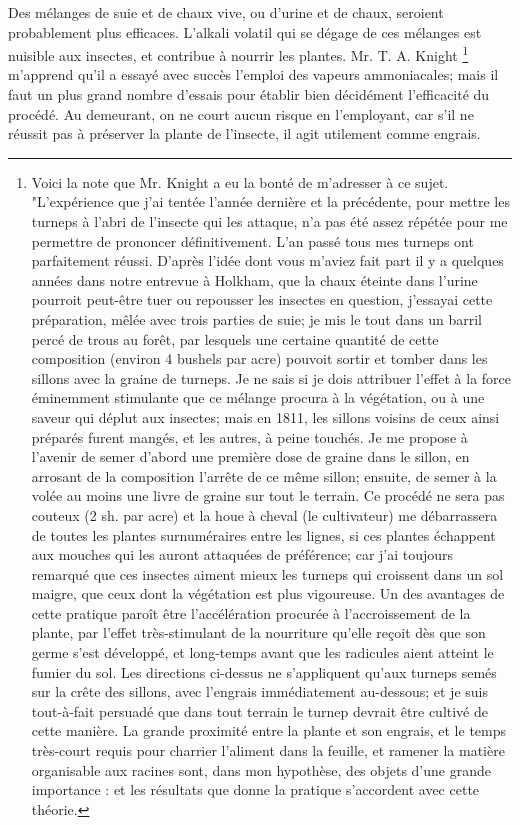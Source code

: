 Des mélanges de suie et de chaux vive, ou d’urine et de chaux, seroient probablement plus efficaces. L’alkali volatil qui se dégage de ces mélanges est nuisible aux insectes, et contribue à nourrir les plantes. Mr. T. A. Knight \footnote{Voici la note que Mr. Knight a eu la bonté de m’adresser à ce sujet.
"L’expérience que j’ai tentée l’année dernière et la précédente, pour mettre les turneps à l'abri de l'insecte qui les attaque, n'a pas été assez répétée pour me permettre de prononcer définitivement. L'an passé tous mes turneps ont parfaitement réussi. D'après l'idée dont vous m'aviez fait part il y a quelques années dans notre entrevue à Holkham, que la chaux éteinte dans l'urine pourroit peut-être tuer ou repousser les insectes en question, j'essayai cette préparation, mêlée avec trois parties de suie; je mis le tout dans un barril percé de trous au forêt, par lesquels une certaine quantité de cette composition (environ 4 bushels par acre) pouvoit sortir et tomber dans les sillons avec la graine de turneps. Je ne sais si je dois attribuer l'effet à la force éminemment stimulante que ce mélange procura à la végétation, ou à une saveur qui déplut aux insectes; mais en 1811, les sillons voisins de ceux ainsi préparés furent mangés, et les autres, à peine touchés. Je me propose à l'avenir de semer d'abord une première dose de graine dans le sillon, en arrosant de la composition l'arrête de ce même sillon; ensuite, de semer à la volée au moins une livre de graine sur tout le terrain. Ce procédé ne sera pas couteux (2 sh. par acre) et la houe à cheval (le cultivateur) me débarrassera de toutes les plantes surnuméraires entre les lignes, si ces plantes échappent aux mouches qui les auront attaquées de préférence; car j'ai toujours remarqué que ces insectes aiment mieux les turneps qui croissent dans un sol maigre, que ceux dont la végétation est plus vigoureuse. Un des avantages de cette pratique paroît être l'accélération procurée à l'accroissement de la plante, par l'effet très-stimulant de la nourriture qu'elle reçoit dès que son germe s'est développé, et long-temps avant que les radicules aient atteint le fumier du sol. Les directions ci-dessus ne s'appliquent qu'aux turneps semés sur la crête des sillons, avec l'engrais immédiatement au-dessous; et je suis tout-à-fait persuadé que dans tout terrain le turnep devrait être cultivé de cette manière. La grande proximité entre la plante et son engrais, et le temps très-court requis pour charrier l'aliment dans la feuille, et ramener la matière organisable aux racines sont, dans mon hypothèse, des objets d'une grande importance : et les résultats que donne la pratique s'accordent avec cette théorie.} m’apprend qu’il a essayé\setcounter{page}{21} avec succès l'emploi des vapeurs ammoniacales; mais il faut un plus grand nombre\setcounter{page}{22} d'essais pour établir bien décidément l'efficacité du procédé. Au demeurant, on ne court aucun risque en l'employant, car s'il ne réussit pas à préserver la plante de l'insecte, il agit utilement comme engrais.
